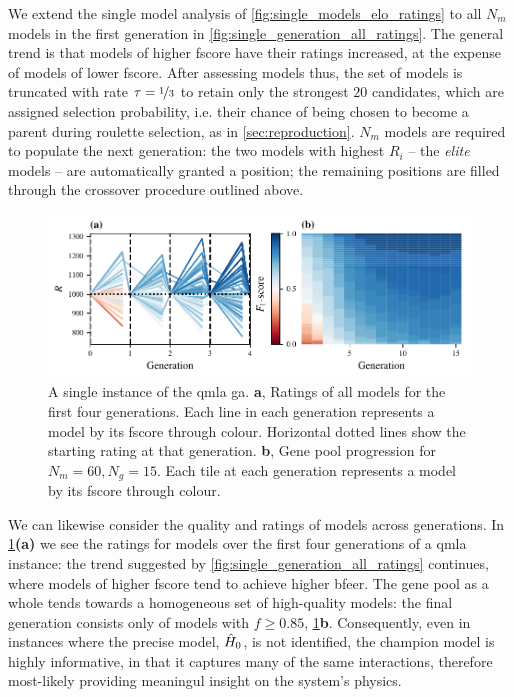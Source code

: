 {We extend the single model analysis of \cref{fig:single_models_elo_ratings} to all $N_m$ models 
    in the first generation in \cref{fig:single_generation_all_ratings}.
The general trend is that models of higher \gls{fscore} have their ratings increased, 
    at the expense of models of lower \gls{fscore}. 
After assessing models thus, the set of models is truncated with rate $\tau=\nicefrac{1}{3}$ to retain only 
    the strongest $20$ candidates,
    which are assigned selection probability, i.e. their chance of being chosen to become a parent during roulette selection, 
    as in \cref{sec:reproduction}.
$N_m$ models are required to populate the next generation:
    the two models with highest $R_i$ -- the \emph{elite} models -- are automatically granted a position;
    the remaining positions are filled through the crossover procedure outlined above.

\par 
\begin{figure}
    \begin{center}
        \includegraphics{theoretical_study/figures/gen_alg_instance_combined.pdf}
    \end{center}
    \caption[Instance of QMLA genetic algorithm]{
        A single \gls{instance} of the \gls{qmla} \acrlong{ga}.
        \textbf{a}, Ratings of all models for the first four generations. 
        Each line in each generation represents a model by its \gls{fscore} through colour. 
        Horizontal dotted lines show the starting rating at that generation. 
        \textbf{b}, Gene pool progression for $N_m=60, N_g=15$. 
        Each tile at each generation represents a model by its \gls{fscore} through colour. 
        \figtableref
    }
    \label{fig:ga_instance}
\end{figure}

We can likewise consider the quality and ratings of models across generations.
In \cref{fig:ga_instance}\textbf{(a)} we see the ratings for models over the first 
    four generations of a \gls{qmla} \gls{instance}:
    the trend suggested by \cref{fig:single_generation_all_ratings} continues,
    where models of higher \gls{fscore} tend to achieve higher \gls{bfeer}.
The gene pool as a whole tends towards a homogeneous set of high-quality models:
    the final generation consists only of models with $f \geq 0.85$, \cref{fig:ga_instance}\textbf{b}. 
Consequently, even in \glspl{instance} where the precise model, $\hat{H}_0$, is not identified, the \gls{champion model}
    is highly informative, in that it captures many of the same interactions, 
    therefore most-likely providing meaningul insight on the system's physics. 

}
